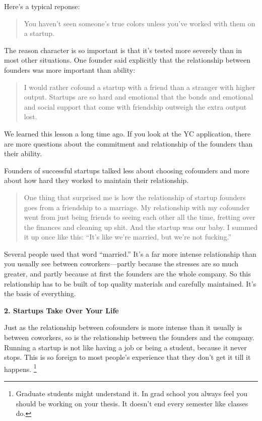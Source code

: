 \documentclass[12pt]{book}
\begin{document}
Here's a typical reponse:

\begin{quote}
You haven't seen someone's true colors unless you've worked with them on
a startup.
\end{quote}

The reason character is so important is that it's tested more severely
than in most other situations. One founder said explicitly that the
relationship between founders was more important than ability:

\begin{quote}
I would rather cofound a startup with a friend than a stranger with
higher output. Startups are so hard and emotional that the bonds and
emotional and social support that come with friendship outweigh the
extra output lost.
\end{quote}

We learned this lesson a long time ago. If you look at the YC
application, there are more questions about the commitment and
relationship of the founders than their ability.

Founders of successful startups talked less about choosing cofounders
and more about how hard they worked to maintain their relationship.

\begin{quote}
One thing that surprised me is how the relationship of startup founders
goes from a friendship to a marriage. My relationship with my cofounder
went from just being friends to seeing each other all the time, fretting
over the finances and cleaning up shit. And the startup was our baby. I
summed it up once like this: ``It's like we're married, but we're not
fucking.''
\end{quote}

Several people used that word ``married.'' It's a far more intense
relationship than you usually see between coworkers---partly because the
stresses are so much greater, and partly because at first the founders
are the whole company. So this relationship has to be built of top
quality materials and carefully maintained. It's the basis of
everything.

\textbf{2. Startups Take Over Your Life}

Just as the relationship between cofounders is more intense than it
usually is between coworkers, so is the relationship between the
founders and the company. Running a startup is not like having a job or
being a student, because it never stops. This is so foreign to most
people's experience that they don't get it till it happens.
\footnote{Graduate students might understand it. In grad school you always
feel you should be working on your thesis. It doesn't end every semester
like classes do.}
\end{document}
